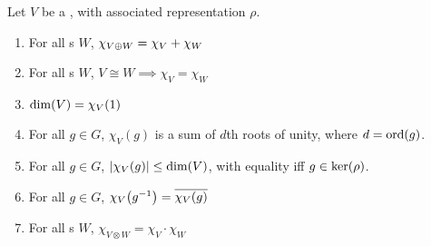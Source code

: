 \begin{boxproposition}\label{Ch2:Prop:Bhv_Char}
    Let $V$ be a \CGM, with associated representation $\rho$.
    \begin{enumerate}[label = \normalfont \arabic*., noitemsep]
        \item For all \CGM s $W$, $\chi_{V \oplus W} = \chi_V + \chi_W$
        \item  For all \CGM s $W$, $V \cong W \implies \chi_V = \chi_W$
        \item $\dim\!\left( V \right) = \chi_V(1)$
        \item For all $g \in G$, $\chi_V(g)$ is a sum of $d$th roots of unity, where $d = \operatorname{ord}\!\left( g \right)$.
        \item For all $g \in G$, $\left\lvert \chi_V(g) \right\rvert \leq \dim\!\left( V \right)$, with equality iff $g \in \operatorname{ker}\!\left( \rho \right)$.
        \item For all $g \in G$, $\chi_V\!\left( g^{-1} \right) = \overline{\chi_V(g)}$
        \item For all \CGM s $W$, $\chi_{V \otimes W} = \chi_V \cdot \chi_W$
    \end{enumerate}
\end{boxproposition}
